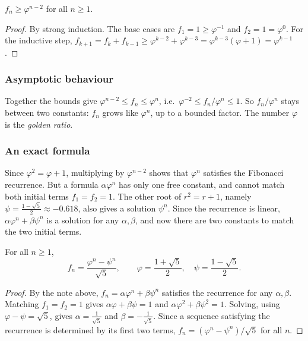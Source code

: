 \begin{proposition}
$f_n \ge \varphi^{n-2}$ for all $n\ge1$.
\end{proposition}
\begin{proof}
By strong induction. The base cases are $f_1=1\ge\varphi^{-1}$ and $f_2=1=\varphi^0$. For the inductive step, $f_{k+1}=f_k+f_{k-1}\ge\varphi^{k-2}+\varphi^{k-3}=\varphi^{k-3}(\varphi+1)=\varphi^{k-1}$.
\end{proof}

\subsubsection{Asymptotic behaviour}
\label{sec:6-7-3}

\begin{note}[Squeezing $f_n$]
Together the bounds give $\varphi^{n-2} \le f_n \le \varphi^n$, i.e.\ $\varphi^{-2} \le f_n/\varphi^n \le 1$. So $f_n/\varphi^n$ stays between two constants: $f_n$ grows like $\varphi^n$, up to a bounded factor. The number $\varphi$ is the \emph{golden ratio}.
\end{note}

\subsubsection{An exact formula}
\label{sec:6-7-4}

\begin{note}
Since $\varphi^2=\varphi+1$, multiplying by $\varphi^{n-2}$ shows that $\varphi^n$ satisfies the Fibonacci recurrence. But a formula $\alpha\varphi^n$ has only one free constant, and cannot match both initial terms $f_1=f_2=1$. The other root of $r^2=r+1$, namely $\psi=\frac{1-\sqrt5}{2}\approx-0.618$, also gives a solution $\psi^n$. Since the recurrence is linear, $\alpha\varphi^n+\beta\psi^n$ is a solution for any $\alpha,\beta$, and now there are two constants to match the two initial terms.
\end{note}

\begin{theorem} \label{thm:binet}
For all $n\ge1$,
\[
f_n = \frac{\varphi^n - \psi^n}{\sqrt5}, \qquad \varphi=\frac{1+\sqrt5}{2},\quad \psi=\frac{1-\sqrt5}{2}.
\]
\end{theorem}
\begin{proof}
By the note above, $f_n = \alpha\varphi^n + \beta\psi^n$ satisfies the recurrence for any $\alpha,\beta$. Matching $f_1=f_2=1$ gives $\alpha\varphi+\beta\psi = 1$ and $\alpha\varphi^2+\beta\psi^2 = 1$. Solving, using $\varphi-\psi=\sqrt5$, gives $\alpha=\frac1{\sqrt5}$ and $\beta=-\frac1{\sqrt5}$. Since a sequence satisfying the recurrence is determined by its first two terms, $f_n=(\varphi^n-\psi^n)/\sqrt5$ for all $n$.
\end{proof}

